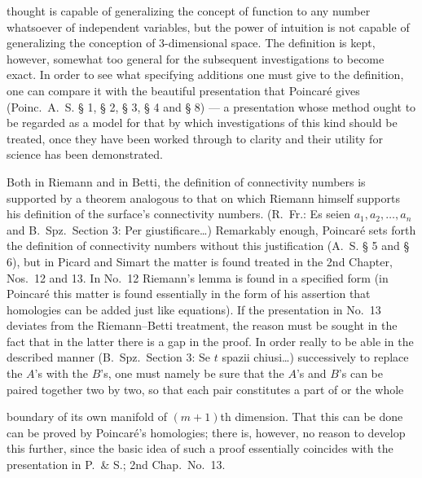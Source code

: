 \documentclass{article}
\begin{document}
thought is capable of generalizing the concept of function to any number whatsoever of independent variables, but the power of intuition is not capable of generalizing the conception of 3-dimensional space. The definition is kept, however, somewhat too general for the subsequent investigations to become exact. In order to see what specifying additions one must give to the definition, one can compare it with the beautiful presentation that Poincaré gives (Poinc.\ A.~S. § 1, § 2, § 3, § 4 and § 8) --- a presentation whose method ought to be regarded as a model for that by which investigations of this kind should be treated, once they have been worked through to clarity and their utility for science has been demonstrated.

Both in Riemann and in Betti, the definition of connectivity numbers is supported by a theorem analogous to that on which Riemann himself supports his definition of the surface's connectivity numbers. (R.~Fr.: Es seien $a_1, a_2, \dots, a_n$ and B.~Spz.\ Section 3: Per giustificare\dots) Remarkably enough, Poincaré sets forth the definition of connectivity numbers without this justification (A.~S. § 5 and § 6), but in Picard and Simart the matter is found treated in the 2nd Chapter, Nos.\ 12 and 13. In No.\ 12 Riemann's lemma is found in a specified form (in Poincaré this matter is found essentially in the form of his assertion that homologies can be added just like equations). If the presentation in No.\ 13 deviates from the Riemann--Betti treatment, the reason must be sought in the fact that in the latter there is a gap in the proof. In order really to be able in the described manner (B.~Spz.\ Section 3: Se $t$ spazii chiusi\dots) successively to replace the $A$'s with the $B$'s, one must namely be sure that the $A$'s and $B$'s can be paired together two by two, so that each pair constitutes a part of or the whole

boundary of its own manifold of $(m + 1)$th dimension. That this can be done can be proved by Poincaré's homologies; there is, however, no reason to develop this further, since the basic idea of such a proof essentially coincides with the presentation in P.\ \& S.; 2nd Chap.\ No.\ 13.
\end{document}
